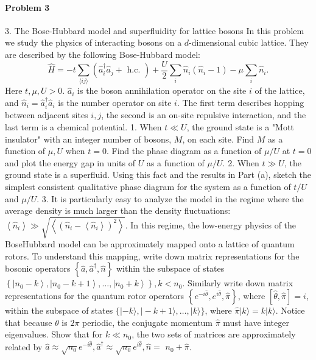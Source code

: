 \documentclass[hyperref, a4paper]{article}
\begin{document}
\paragraph{Problem 3} 3. The Bose-Hubbard model and superfluidity for lattice bosons
In this problem we study the physics of interacting bosons on a $d$-dimensional cubic lattice. They are described by the following Bose-Hubbard model:
$$
\hat{H}=-t \sum_{\langle i j\rangle}\left(\hat{a}_i^{\dagger} \hat{a}_j+\text { h.c. }\right)+\frac{U}{2} \sum_i \hat{n}_i\left(\hat{n}_i-1\right)-\mu \sum_i \hat{n}_i .
$$
Here $t, \mu, U>0$. $\hat{a}_i$ is the boson annihilation operator on the site $i$ of the lattice, and $\hat{n}_i=\hat{a}_i^{\dagger} \hat{a}_i$ is the number operator on site $i$. The first term describes hopping between adjacent sites $i, j$, the second is an on-site repulsive interaction, and the last term is a chemical potential.
1. When $t \ll U$, the ground state is a "Mott insulator" with an integer number of bosons, $M$, on each site. Find $M$ as a function of $\mu, U$ when $t=0$. Find the phase diagram as a function of $\mu / U$ at $t=0$ and plot the energy gap in units of $U$ as a function of $\mu / U$.
2. When $t \gg U$, the ground state is a superfluid. Using this fact and the results in Part (a), sketch the simplest consistent qualitative phase diagram for the system as a function of $t / U$ and $\mu / U$.
3. It is particularly easy to analyze the model in the regime where the average density is much larger than the density fluctuations: $\left\langle\hat{n}_i\right\rangle \gg \sqrt{\left\langle\left(\hat{n}_i-\left\langle\hat{n}_i\right\rangle\right)^2\right\rangle}$. In this regime, the low-energy physics of the BoseHubbard model can be approximately mapped onto a lattice of quantum rotors. To understand this mapping, write down matrix representations for the bosonic operators $\left\{\hat{a}, \hat{a}^{\dagger}, \hat{n}\right\}$ within the subspace of states $\left\{\left|n_0-k\right\rangle,\left|n_0-k+1\right\rangle, \ldots,\left|n_0+k\right\rangle\right\}, k<n_0$. Similarly write down matrix representations for the quantum rotor operators $\left\{e^{-i \hat{\theta}}, e^{i \hat{\theta}}, \hat{\pi}\right\}$, where $[\hat{\theta}, \hat{\pi}]=i$, within the subspace of states $\{|-k\rangle,|-k+1\rangle, \ldots,|k\rangle\}$, where $\hat{\pi}|k\rangle=k|k\rangle$. Notice that because $\theta$ is $2 \pi$ periodic, the conjugate momentum $\hat{\pi}$ must have integer eigenvalues.
Show that for $k \ll n_0$, the two sets of matrices are approximately related by $\hat{a} \approx \sqrt{n_0} e^{-i \hat{\theta}}, \hat{a}^{\dagger} \approx \sqrt{n_0} e^{i \hat{\theta}}, \hat{n}=$ $n_0+\hat{\pi}$.
\end{document}
